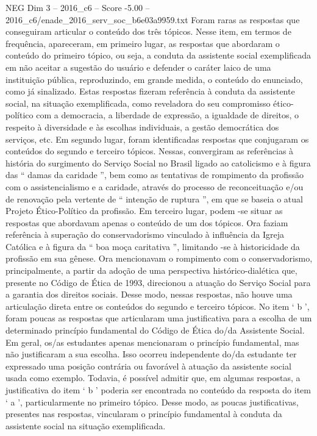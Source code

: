 \begin{textsample}{NEG Dim 3 – 2016\_c6 – Score -5.00 – 2016\_c6/enade\_2016\_serv\_soc\_b6e03a9959.txt}
Foram raras as respostas que conseguiram articular o conteúdo dos três tópicos.
Nesse item, em termos de frequência, apareceram, em primeiro lugar, as respostas que abordaram o conteúdo do primeiro tópico, ou seja, a conduta da assistente social exemplificada em não aceitar a sugestão do usuário e defender o caráter laico de uma instituição pública, reproduzindo, em grande medida, o conteúdo do enunciado, como já sinalizado.
Estas respostas fizeram referência à conduta da assistente social, na situação exemplificada, como reveladora do seu compromisso ético-político com a democracia, a liberdade de expressão, a igualdade de direitos, o respeito à diversidade e às escolhas individuais, a gestão democrática dos serviços, etc.
Em segundo lugar, foram identificadas respostas que conjugaram os conteúdos do segundo e terceiro tópicos.
Nessas, convergiram as referências à história do surgimento do Serviço Social no Brasil ligado ao catolicismo e à figura das “ damas da caridade ”, bem como as tentativas de rompimento da profissão com o assistencialismo e a caridade, através do processo de reconceituação e/ou de renovação pela vertente de “ intenção de ruptura ”, em que se baseia o atual Projeto Ético-Político da profissão.
Em terceiro lugar, podem -se situar as respostas que abordavam apenas o conteúdo de um dos tópicos.
Ora faziam referência à superação do conservadorismo vinculado à influência da Igreja Católica e à figura da “ boa moça caritativa ”, limitando -se à historicidade da profissão em sua gênese.
Ora mencionavam o rompimento com o conservadorismo, principalmente, a partir da adoção de uma perspectiva histórico-dialética que, presente no Código de Ética de 1993, direcionou a atuação do Serviço Social para a garantia dos direitos sociais.
Desse modo, nessas respostas, não houve uma articulação direta entre os conteúdos do segundo e terceiro tópicos.
No item ‘ b ’, foram poucas as respostas que articularam uma justificativa para a escolha de um determinado princípio fundamental do Código de Ética do/da Assistente Social.
Em geral, os/as estudantes apenas mencionaram o princípio fundamental, mas não justificaram a sua escolha.
Isso ocorreu independente do/da estudante ter expressado uma posição contrária ou favorável à atuação da assistente social usada como exemplo.
Todavia, é possível admitir que, em algumas respostas, a justificativa do item ‘ b ’ poderia ser encontrada no conteúdo da resposta do item ‘ a ’, particularmente no primeiro tópico.
Desse modo, as poucas justificativas, presentes nas respostas, vincularam o princípio fundamental à conduta da assistente social na situação exemplificada.

\end{textsample}

